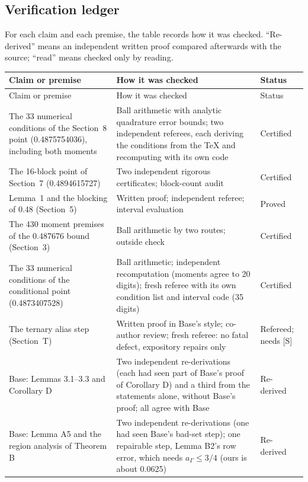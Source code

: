 \documentclass[11pt]{article}
\theoremstyle{plain}
\begin{document}
\subsection*{Verification ledger}
For each claim and each premise, the table records how it was checked. ``Re-derived'' means an independent written proof compared afterwards with the source; ``read'' means checked only by reading.

{\small
\begin{longtable}{@{}>{\raggedright\arraybackslash}p{4.2cm}>{\raggedright\arraybackslash}p{8.7cm}>{\raggedright\arraybackslash}p{2.6cm}@{}}
\toprule
Claim or premise & How it was checked & Status \\
\midrule
\endfirsthead
\toprule
Claim or premise & How it was checked & Status \\
\midrule
\endhead
\bottomrule
\endlastfoot
The 33 numerical conditions of the Section~8 point (0.4875754036), including both moments & Ball arithmetic with analytic quadrature error bounds; two independent referees, each deriving the conditions from the \TeX{} and recomputing with its own code & Certified \\
The 16-block point of Section~7 (0.4894615727) & Two independent rigorous certificates; block-count audit & Certified \\
Lemma~1 and the blocking of 0.48 (Section~5) & Written proof; independent referee; interval evaluation & Proved \\
The 430 moment premises of the 0.487676 bound (Section~3) & Ball arithmetic by two routes; outside check & Certified \\
The 33 numerical conditions of the conditional point (0.4873407528) & Ball arithmetic; independent recomputation (moments agree to 20 digits); fresh referee with its own condition list and interval code (35 digits) & Certified \\
The ternary alias step (Section~T) & Written proof in Base's style; co-author review; fresh referee: no fatal defect, expository repairs only & Refereed; needs [S] \\
Base: Lemmas 3.1--3.3 and Corollary D & Two independent re-derivations (each had seen part of Base's proof of Corollary D) and a third from the statements alone, without Base's proof; all agree with Base & Re-derived \\
Base: Lemma A5 and the region analysis of Theorem B & Two independent re-derivations (one had seen Base's bad-set step); one repairable step, Lemma B2's row error, which needs $a_\Gamma \le 3/4$ (ours is about 0.0625) & Re-derived \\

\end{longtable}}
\end{document}
